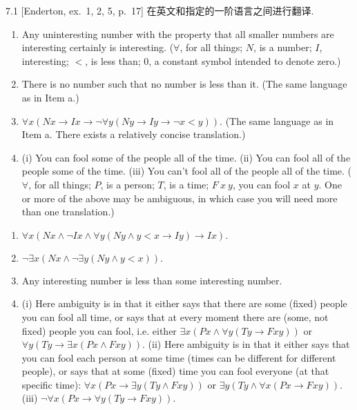 
\begin{exercise}{7.1}
  [Enderton, ex.~1, 2, 5, p.~17]
  在英文和指定的一阶语言之间进行翻译.
  \begin{enumerate}[label=(\alph*)]
    \item Any uninteresting number with the property that all smaller numbers are interesting certainly is interesting. ($\forall$, for all things; $N$, is a number; $I$, interesting; $<$, is less than; $0$, a constant symbol intended to denote zero.)
    \item There is no number such that no number is less than it. (The same language as in Item a.)
    \item $\forall x(Nx\rightarrow Ix\rightarrow\neg\forall y(Ny\rightarrow Iy\rightarrow\neg x<y))$. (The same language as in Item a. There exists a relatively concise translation.)
    \item (i) You can fool some of the people all of the time. (ii) You can fool all of the people some of the time. (iii) You can't fool all of the people all of the time. ($\forall$, for all things; $P$, is a person; $T$, is a time; $F\ x\ y$, you can fool $x$ at $y$. One or more of the above may be ambiguous, in which case you will need more than one translation.)\qedhere
  \end{enumerate}
\end{exercise}

\begin{enumerate}[label=(\alph*)]
  \item $\forall x(Nx\wedge\neg Ix\wedge\forall y (Ny\wedge y<x\rightarrow Iy)\rightarrow Ix).$
  \item $\neg\exists x(Nx\wedge\neg\exists y(Ny\wedge y<x)).$
  \item Any interesting number is less than some interesting number.
  \item (i) Here ambiguity is in that it either says that there are some (fixed) people you can fool all time, or says that at every moment there are (some, not fixed) people you can fool, i.e. either $\exists x(Px\wedge\forall y(Ty\to Fxy))$ or $\forall y(Ty\to\exists x(Px\wedge Fxy))$. (ii) Here ambiguity is in that it either says that you can fool each person at some time (times can be different for different people), or says that at some (fixed) time you can fool everyone (at that specific time): $\forall x(Px\to\exists y(Ty\wedge Fxy))$ or $\exists y(Ty\wedge\forall x(Px\to Fxy))$. (iii) $\neg\forall x(Px\to\forall y(Ty\to Fxy)).$
\end{enumerate}

